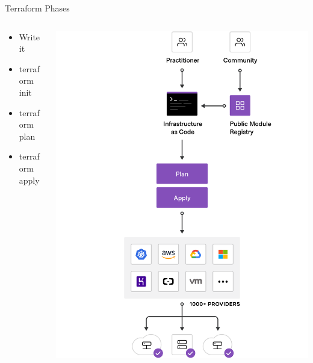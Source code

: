 \documentclass{beamer}
\begin{document}
\begin{frame}{Terraform Phases}

\begin{columns}
    \begin{column}{.5\textwidth}
        \begin{itemize}
           \item Write it
           \item terraform init
           \item terraform plan
           \item terraform apply
        \end{itemize}
    \end{column}
    \begin{column}{.5\textwidth}
        \includegraphics[width=\textwidth,keepaspectratio]{./assets/writeplanapply.png}
    \end{column}
\end{columns}

\end{frame}
\end{document}
